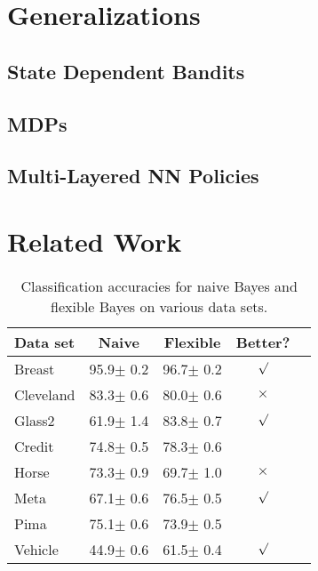 \section{Generalizations}

\subsection{State Dependent Bandits}

\subsection{MDPs}

\subsection{Multi-Layered NN Policies}

\section{Related Work}




\nocite{langley00}
\fi

\begin{table}[t]
\caption{Classification accuracies for naive Bayes and flexible
Bayes on various data sets.}
\label{sample-table}
\vskip 0.15in
\begin{center}
\begin{small}
\begin{sc}
\begin{tabular}{lcccr}
\toprule
Data set & Naive & Flexible & Better? \\
\midrule
Breast    & 95.9$\pm$ 0.2& 96.7$\pm$ 0.2& $\surd$ \\
Cleveland & 83.3$\pm$ 0.6& 80.0$\pm$ 0.6& $\times$\\
Glass2    & 61.9$\pm$ 1.4& 83.8$\pm$ 0.7& $\surd$ \\
Credit    & 74.8$\pm$ 0.5& 78.3$\pm$ 0.6&         \\
Horse     & 73.3$\pm$ 0.9& 69.7$\pm$ 1.0& $\times$\\
Meta      & 67.1$\pm$ 0.6& 76.5$\pm$ 0.5& $\surd$ \\
Pima      & 75.1$\pm$ 0.6& 73.9$\pm$ 0.5&         \\
Vehicle   & 44.9$\pm$ 0.6& 61.5$\pm$ 0.4& $\surd$ \\
\bottomrule
\end{tabular}
\end{sc}
\end{small}
\end{center}
\vskip -0.1in
\end{table}
\fi